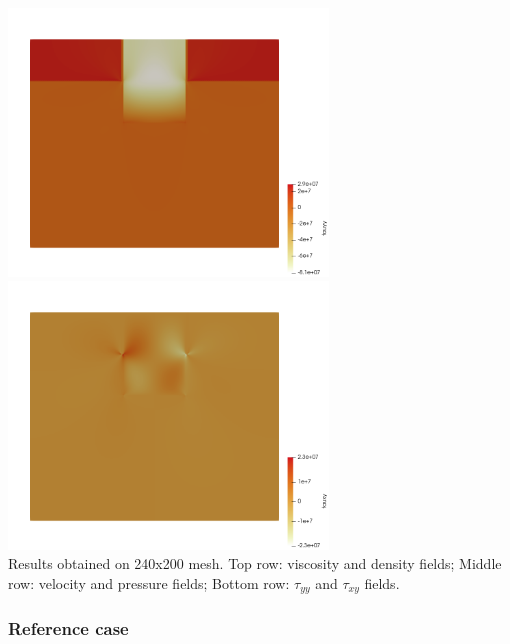 \begin{center}
\includegraphics[width=8.5cm]{python_codes/fieldstone_160/results/tau_yy.png}
\includegraphics[width=8.5cm]{python_codes/fieldstone_160/results/tau_xy.png}\\
{\captionfont Results obtained on 240x200 mesh. Top row: viscosity and density fields;
Middle row: velocity and pressure fields; 
Bottom row: $\tau_{yy}$ and $\tau_{xy}$ fields.}
\end{center}


\newpage

\subsubsection*{Reference case}

